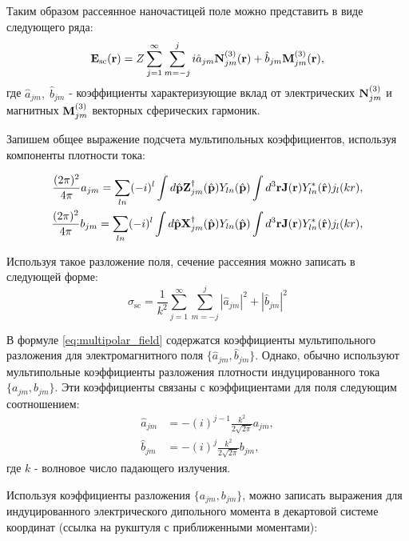 Таким образом рассеянное наночастицей поле можно представить в виде следующего ряда:
\begin{equation}
    \vb{E}_{\text{sc}} (\vb{r}) = Z \sum_{j=1}^{\infty} \sum_{m=-j}^{j} i \hat{a}_{jm} \vb{N}_{jm}^{(3)}(\vb{r}) + \hat{b}_{jm} \vb{M}_{jm}^{(3)} (\vb{r}),\label{eq:multipolar_field}
\end{equation}
где $\hat{a}_{jm},\;\hat{b}_{jm}$ - коэффициенты характеризующие вклад от электрических $\vb{N}_{jm}^{(3)}$ и магнитных $\vb{M}_{jm}^{(3)}$ векторных сферических гармоник. 

Запишем общее выражение подсчета мультипольных коэффициентов, используя компоненты плотности тока:

\begin{align}
    \frac{(2\pi)^2}{4\pi} a_{jm} = \sum_{ln} (-i)^l \int d \hat{\vb{p}} \vb{Z}^{\dag}_{jm}(\hat{\vb{p}}) Y_{ln}(\hat{\vb{p}}) \int d^3 \vb{r} \vb{J}(\vb{r}) Y_{ln}^* (\hat{\vb{r}}) j_l(kr),\\
    \frac{(2\pi)^2}{4\pi} b_{jm} = \sum_{ln} (-i)^l \int d \hat{\vb{p}} \vb{X}^{\dag}_{jm}(\hat{\vb{p}}) Y_{ln}(\hat{\vb{p}}) \int d^3 \vb{r} \vb{J}(\vb{r}) Y_{ln}^* (\hat{\vb{r}}) j_l(kr),
\end{align}

Используя такое разложение поля, сечение рассеяния можно записать в следующей форме:
\begin{equation}
    \sigma_{\text{sc}} = \frac{1}{k^2} \sum_{j=1}^{\infty} \sum_{m=-j}^j |\hat{a}_{jm} |^2 + |\hat{b}_{jm}|^2 \label{eq:scat_sc}
\end{equation}

В формуле \eqref{eq:multipolar_field} содержатся коэффициенты мультипольного разложения для электромагнитного поля $\{\hat{a}_{jm}, \hat{b}_{jm}\}$. Однако, обычно используют мультипольные коэффициенты разложения плотности индуцированного тока $\{a_{jm}, b_{jm}\}$. Эти коэффициенты связаны с коэффициентами для поля следующим соотношением:
\begin{align}
    \hat{a}_{jm} &= -(i)^{j-1} \frac{k^2}{2 \sqrt{2 \pi}} a_{jm},\\
    \hat{b}_{jm} &= -(i)^j \frac{k^2}{2 \sqrt{2 \pi}} b_{jm},
\end{align}
где $k$ - волновое число падающего излучения. 

Используя коэффициенты разложения $\{a_{jm}, b_{jm}\}$, можно записать выражения для индуцированного электрического дипольного момента в декартовой системе координат (ссылка на рукштуля с приближенными моментами):

